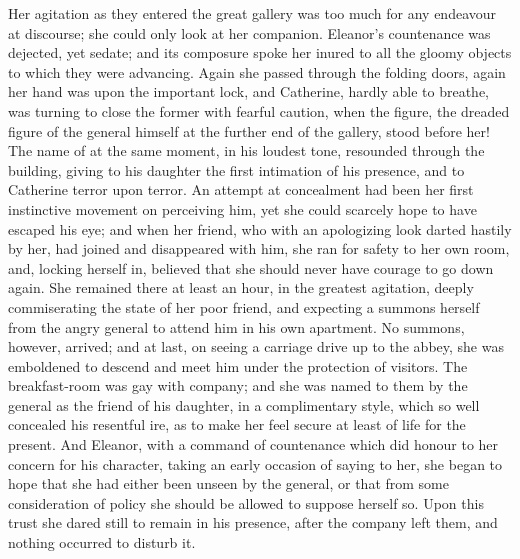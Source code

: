 Her agitation as they entered the great gallery was too much for any endeavour at discourse; she could only look at her companion. Eleanor's countenance was dejected, yet sedate; and its composure spoke her inured to all the gloomy objects to which they were advancing. Again she passed through the folding doors, again her hand was upon the important lock, and Catherine, hardly able to breathe, was turning to close the former with fearful caution, when the figure, the dreaded figure of the general himself at the further end of the gallery, stood before her! The name of  at the same moment, in his loudest tone, resounded through the building, giving to his daughter the first intimation of his presence, and to Catherine terror upon terror. An attempt at concealment had been her first instinctive movement on perceiving him, yet she could scarcely hope to have escaped his eye; and when her friend, who with an apologizing look darted hastily by her, had joined and disappeared with him, she ran for safety to her own room, and, locking herself in, believed that she should never have courage to go down again. She remained there at least an hour, in the greatest agitation, deeply commiserating the state of her poor friend, and expecting a summons herself from the angry general to attend him in his own apartment. No summons, however, arrived; and at last, on seeing a carriage drive up to the abbey, she was emboldened to descend and meet him under the protection of visitors. The breakfast-room was gay with company; and she was named to them by the general as the friend of his daughter, in a complimentary style, which so well concealed his resentful ire, as to make her feel secure at least of life for the present. And Eleanor, with a command of countenance which did honour to her concern for his character, taking an early occasion of saying to her,  she began to hope that she had either been unseen by the general, or that from some consideration of policy she should be allowed to suppose herself so. Upon this trust she dared still to remain in his presence, after the company left them, and nothing occurred to disturb it.

